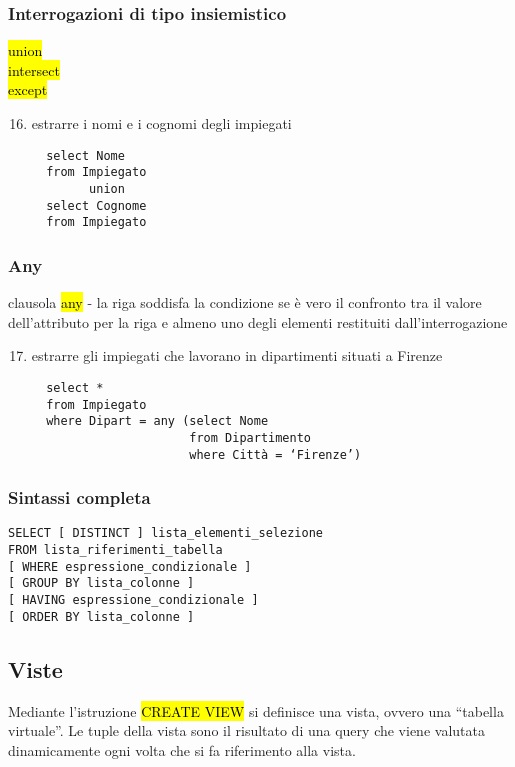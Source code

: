 \documentclass[a4paper]{article}
\begin{document}
\subsubsection{Interrogazioni di tipo insiemistico}
\hl{union}\\
\hl{intersect}\\
\hl{except}
\begin{enumerate}
  \setcounter{enumi}{15}
  \item estrarre i nomi e i cognomi degli impiegati
  \begin{verbatim}
  select Nome
  from Impiegato
        union
  select Cognome
  from Impiegato
  \end{verbatim}
\end{enumerate}

\subsubsection{Any}
clausola \hl{any} - la riga soddisfa la condizione se è vero il confronto tra il valore dell’attributo per la riga e almeno uno degli elementi restituiti dall’interrogazione
\begin{enumerate}
  \setcounter{enumi}{16}
  \item estrarre gli impiegati che lavorano in dipartimenti situati a Firenze
  \begin{verbatim}
  select *
  from Impiegato
  where Dipart = any (select Nome
                      from Dipartimento
                      where Città = ‘Firenze’)
  \end{verbatim}
\end{enumerate}

\subsubsection{Sintassi completa}
\begin{verbatim}
SELECT [ DISTINCT ] lista_elementi_selezione
FROM lista_riferimenti_tabella
[ WHERE espressione_condizionale ]
[ GROUP BY lista_colonne ]
[ HAVING espressione_condizionale ]
[ ORDER BY lista_colonne ]
\end{verbatim}



\subsection{Viste}
Mediante l’istruzione \hl{CREATE VIEW} si definisce una vista, ovvero una “tabella virtuale”. Le tuple della vista sono il risultato di una query che viene valutata dinamicamente ogni volta che si fa riferimento alla vista.
\end{document}
